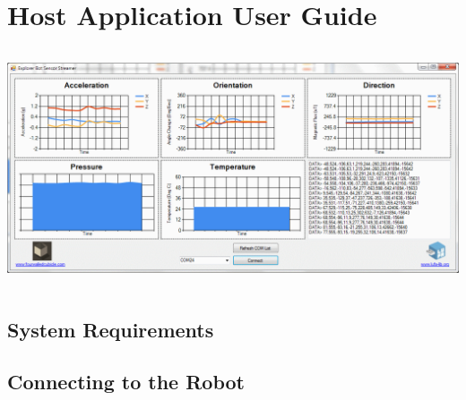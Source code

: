 \chapter{Host Application User Guide}
\label{Appendix D}

\begin{center}
	\includegraphics[height=70mm]{./Figures/SensorDataApp.png}
\end{center}


\section{System Requirements}


\section{Connecting to the Robot}

